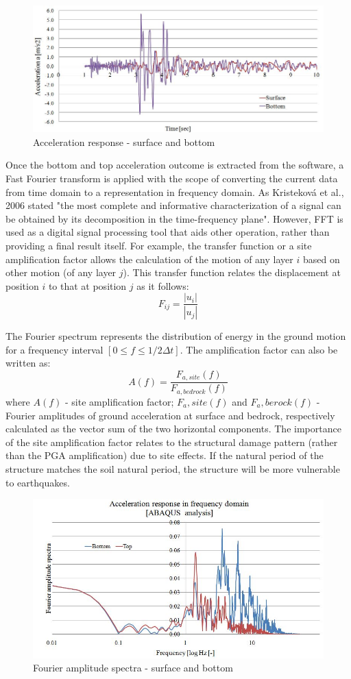 	\begin{figure}[h!]
		\centering
		\includegraphics[width=0.7\linewidth]{"acc_response2"}
		\caption{Acceleration response - surface and bottom}
		\label{acc_resp2}
	\end{figure}
	Once the bottom and top acceleration outcome is extracted from the software, a Fast Fourier transform is applied with the scope of converting the current data from time domain to a \mbox{representation} in frequency domain. As Kristeková et al., 2006 \cite{kristekova2006misfit} stated "the most complete and informative characterization of a signal can be obtained by its decomposition in the time-frequency plane". However, FFT is used as a digital signal processing tool that aids other operation, rather than providing a final result itself. For example, the transfer function or a site amplification factor allows the calculation of the motion of any layer $i$ based on other motion (of any layer $j$). This transfer function relates the displacement at position $i$ to that at position $j$ as it follows:
	\begin{equation}
	F_{ij}=\frac{|u_i|}{|u_j|}
	\end{equation}
	
	The Fourier spectrum represents the distribution of energy in the ground motion for a frequency interval $[0 ≤ f ≤ 1/2\Delta t]$. The amplification factor can also be written as:
	\begin{equation}
	A(f)=\frac{F_{a,site}(f)}{F_{a,bedrock}(f)}
	\end{equation}
	where $A(f)$ - site amplification factor; $F_a,site(f)$ and $F_a,berock(f)$ - Fourier amplitudes of ground acceleration at surface and bedrock, respectively calculated as the vector sum of the two horizontal components. The importance of the site amplification factor relates to the structural damage pattern (rather than the PGA amplification) due to site effects. If the natural period of the structure matches the soil natural period, the structure will be more vulnerable to earthquakes. 
	\begin{figure}[h!]
		\centering
		\includegraphics[width=0.7\linewidth]{"Fourier"}
		\caption{Fourier amplitude spectra - surface and bottom}
		\label{fourier}
	\end{figure}
	

